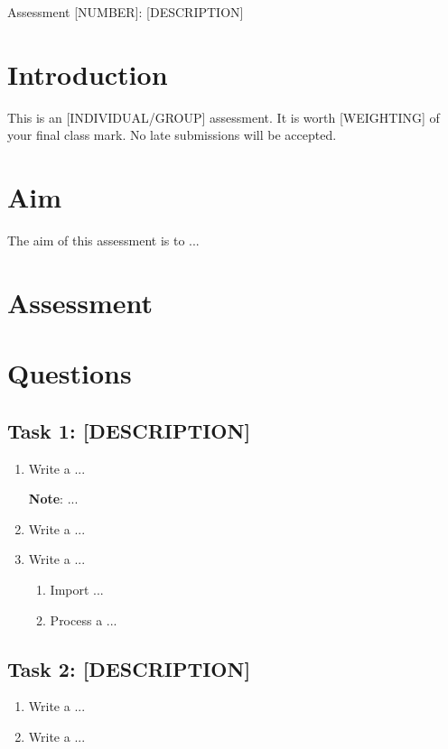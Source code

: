 \documentclass[10pt,a4paper]{article}
\newcommand{\AssignmentName}{Assessment [NUMBER]}
\begin{document}
{
\centering 
\huge{\AssignmentName: [DESCRIPTION]}\par
}
\section{Introduction}
This is an [INDIVIDUAL/GROUP] assessment. It is worth [WEIGHTING] of your final class mark. No late submissions will be accepted.

\section{Aim}
The aim of this assessment is to ...

\section{Assessment}


\section{Questions}

\subsection{Task 1: [DESCRIPTION]}

\begin{enumerate}
\item{Write a ...}

\textbf{Note}: ... 

\item{Write a ...}
\item{Write a ...}

\begin{enumerate}
\item{Import ...}
\item{Process a ...}
\end{enumerate}
\end{enumerate}

\subsection{Task 2: [DESCRIPTION]}
\begin{enumerate}
\item{Write a ...}

\item{Write a ...}
\end{enumerate}
\end{document}

